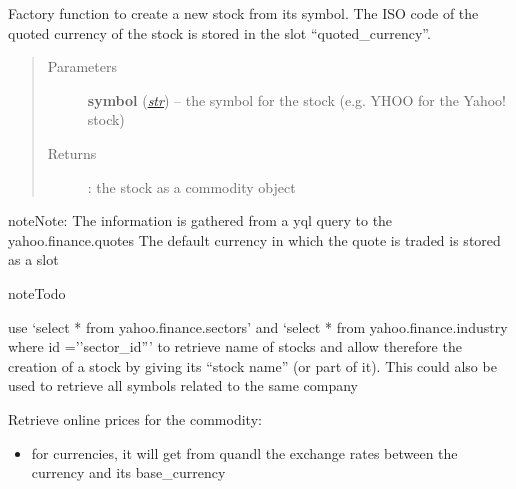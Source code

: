 \documentclass[letterpaper,10pt,english]{sphinxmanual}
\begin{document}
\begin{fulllineitems}
\begin{fulllineitems}
\end{fulllineitems}


\begin{fulllineitems}
\label{api/piecash.model_core.commodity:piecash.model_core.commodity.Commodity.create_stock_from_symbol}
Factory function to create a new stock from its symbol. The ISO code of the quoted currency of the stock is
stored in the slot ``quoted\_currency''.
\begin{quote}\begin{description}
\item[{Parameters}] \leavevmode
\textbf{symbol} (\href{http://docs.python.org/library/functions.html\#str}{\emph{str}}) -- the symbol for the stock (e.g. YHOO for the Yahoo! stock)

\item[{Returns}] \leavevmode
{\hyperref[api/piecash.model_core.commodity:piecash.model_core.commodity.Commodity]{}}: the stock as a commodity object

\end{description}\end{quote}

\begin{notice}{note}{Note:}
The information is gathered from a yql query to the yahoo.finance.quotes
The default currency in which the quote is traded is stored as a slot
\end{notice}

\begin{notice}{note}{Todo}

use `select * from yahoo.finance.sectors' and `select * from yahoo.finance.industry where id =''sector\_id'''
to retrieve name of stocks and allow therefore the creation of a stock by giving its ``stock name'' (or part of it).
This could also be used to retrieve all symbols related to the same company
\end{notice}

\end{fulllineitems}


\begin{fulllineitems}
\label{api/piecash.model_core.commodity:piecash.model_core.commodity.Commodity.update_prices}
Retrieve online prices for the commodity:
\begin{itemize}
\item {} 
for currencies, it will get from quandl the exchange rates between the currency and its base\_currency


\end{itemize}
\end{fulllineitems}
\end{fulllineitems}
\end{document}
